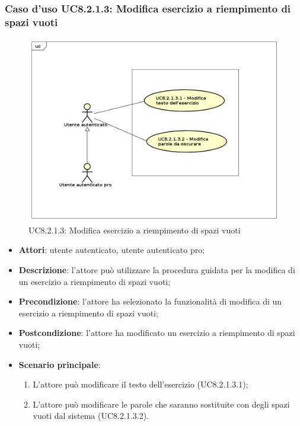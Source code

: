 \subsubsection{Caso d'uso UC8.2.1.3: Modifica esercizio a riempimento di spazi vuoti}
	\label{UC8.2.1.3}
	\begin{figure}[h]
		\centering
			\includegraphics[scale=0.45,keepaspectratio]{UML/UC8_2_1_3.png}
		\caption{UC8.2.1.3: Modifica esercizio a riempimento di spazi vuoti}
	\end{figure}
	\FloatBarrier
	\begin{itemize}
		\item
			\textbf{Attori}: utente autenticato, utente autenticato pro;
		\item		
			\textbf{Descrizione}: l'attore può utilizzare la procedura guidata per la modifica di un esercizio a riempimento di spazi vuoti;
		\item
			\textbf{Precondizione}: l'attore ha selezionato la funzionalità di modifica di un esercizio a riempimento di spazi vuoti; 
		\item
			\textbf{Postcondizione}: l'attore ha modificato un esercizio a riempimento di spazi vuoti;
		\item
			\textbf{Scenario principale}:
	       		\begin{enumerate}
	       			\item
	       			L'attore può modificare il testo dell'esercizio (UC8.2.1.3.1);
	       			\item
	       			L'attore può modificare le parole che saranno sostituite con degli spazi vuoti dal sistema (UC8.2.1.3.2).
	 			\end{enumerate}
	\end{itemize}
	
